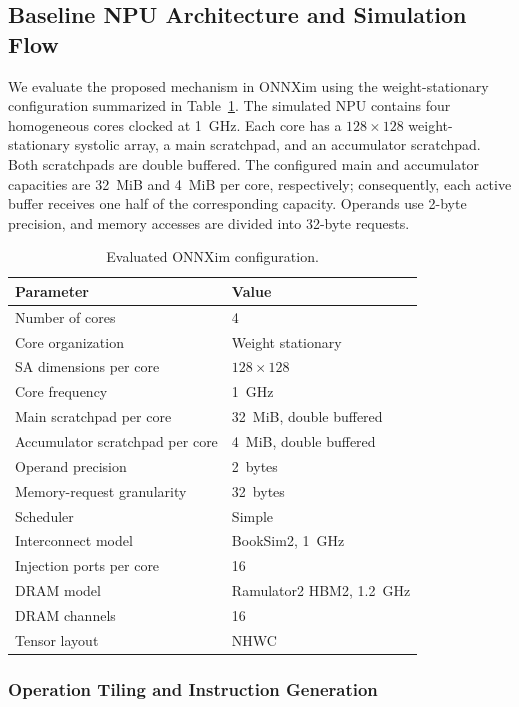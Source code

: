 \subsection{Baseline NPU Architecture and Simulation Flow}
\label{sec:onnxim-architecture}

We evaluate the proposed mechanism in ONNXim using the weight-stationary
configuration summarized in Table~\ref{tab:baseline-configuration}. The
simulated NPU contains four homogeneous cores clocked at 1~GHz. Each core has
a $128\times128$ weight-stationary systolic array, a main scratchpad, and an
accumulator scratchpad. Both scratchpads are double buffered. The configured
main and accumulator capacities are 32~MiB and 4~MiB per core, respectively;
consequently, each active buffer receives one half of the corresponding
capacity. Operands use 2-byte precision, and memory accesses are divided into
32-byte requests.

\begin{table}[t]
  \centering
  \caption{Evaluated ONNXim configuration.}
  \label{tab:baseline-configuration}
  \begin{tabular}{ll}
    \toprule
    Parameter & Value \\
    \midrule
    Number of cores & 4 \\
    Core organization & Weight stationary \\
    SA dimensions per core & $128\times128$ \\
    Core frequency & 1~GHz \\
    Main scratchpad per core & 32~MiB, double buffered \\
    Accumulator scratchpad per core & 4~MiB, double buffered \\
    Operand precision & 2~bytes \\
    Memory-request granularity & 32~bytes \\
    Scheduler & Simple \\
    Interconnect model & BookSim2, 1~GHz \\
    Injection ports per core & 16 \\
    DRAM model & Ramulator2 HBM2, 1.2~GHz \\
    DRAM channels & 16 \\
    Tensor layout & NHWC \\
    \bottomrule
  \end{tabular}
\end{table}

\subsubsection{Operation Tiling and Instruction Generation}

